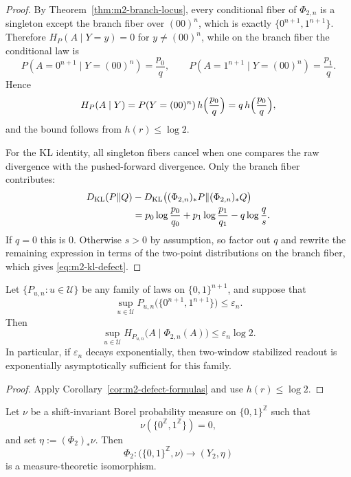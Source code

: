 \begin{proof}
By Theorem~\ref{thm:m2-branch-locus}, every conditional fiber of $\Phi_{2,n}$ is a singleton except the branch fiber over $(00)^n$, which is exactly $\{0^{n+1},1^{n+1}\}$. Therefore $H_P(A\mid Y=y)=0$ for $y\neq (00)^n$, while on the branch fiber the conditional law is
\[
P(A=0^{n+1}\mid Y=(00)^n)=\frac{p_0}{q},
\qquad
P(A=1^{n+1}\mid Y=(00)^n)=\frac{p_1}{q}.
\]
Hence
\[
H_P(A\mid Y)=P(Y=(00)^n)\,h\Bigl(\frac{p_0}{q}\Bigr)=q\,h\Bigl(\frac{p_0}{q}\Bigr),
\]
and the bound follows from $h(r)\le \log 2$.

For the KL identity, all singleton fibers cancel when one compares the raw divergence with the pushed-forward divergence. Only the branch fiber contributes:
\begin{equation*}
\begin{aligned}
D_{\mathrm{KL}}(P\|Q)&-D_{\mathrm{KL}}\bigl((\Phi_{2,n})_*P\|(\Phi_{2,n})_*Q\bigr)
\\
&=
p_0\log\frac{p_0}{q_0}
+
p_1\log\frac{p_1}{q_1}
-
q\log\frac{q}{s}.
\end{aligned}
\end{equation*}
If $q=0$ this is $0$. Otherwise $s>0$ by assumption, so factor out $q$ and rewrite the remaining expression in terms of the two-point distributions on the branch fiber, which gives \eqref{eq:m2-kl-defect}.
\end{proof}

\begin{corollary}\label{cor:m2-asymptotic-sufficiency}
Let $\{P_{u,n}:u\in\mathcal U\}$ be any family of laws on $\{0,1\}^{n+1}$, and suppose that
\[
\sup_{u\in\mathcal U} P_{u,n}\bigl(\{0^{n+1},1^{n+1}\}\bigr)\le \varepsilon_n.
\]
Then
\[
\sup_{u\in\mathcal U} H_{P_{u,n}}\bigl(A\mid \Phi_{2,n}(A)\bigr)\le \varepsilon_n\log 2.
\]
In particular, if $\varepsilon_n$ decays exponentially, then two-window stabilized readout is exponentially asymptotically sufficient for this family.
\end{corollary}

\begin{proof}
Apply Corollary~\ref{cor:m2-defect-formulas} and use $h(r)\le \log 2$.
\end{proof}

\begin{corollary}\label{cor:m2-mod-zero}
Let $\nu$ be a shift-invariant Borel probability measure on $\{0,1\}^{\mathbb Z}$ such that
\[
\nu(\{0^{\mathbb Z},1^{\mathbb Z}\})=0,
\]
and set $\eta:=(\Phi_2)_*\nu$. Then
\[
\Phi_2:\bigl(\{0,1\}^{\mathbb Z},\nu\bigr)\longrightarrow (Y_2,\eta)
\]
is a measure-theoretic isomorphism.
\end{corollary}

